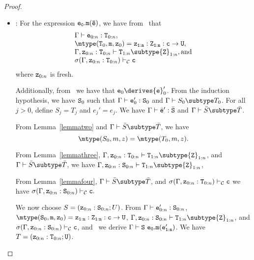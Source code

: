 \begin{proof}
\begin{itemize}
\begin{itemize}
   \item
   \RCInvkRecv: For the expression ${\tt e_0.m(\bar{e})}$,
            we have from \TInvk\ that
            $$
            \begin{array}{l}
            \Gamma \vdash {\tt e}_{0:n} : {\tt T}_{0:n}, \\
            \mtype({\tt T}_0,{\tt m},{\tt z}_0) = 
               \tt {\tt z}_{1:n}: {\tt Z}_{1:n}:c \rightarrow {\tt U}, \\
            \Gamma, {\tt z}_{0:n}: {\tt T}_{0:n} \vdash 
                  {\tt T}_{1:n} \subtype {\tt Z}_{1:n}, \mbox{and} \\
            \sigma(\Gamma, {\tt z}_{0:n}: {\tt T}_{0:n})
                  \vdash_{\cal C} {\tt c} \\
            \end{array}$$
            where ${\tt z}_{0:n}$ is fresh.

            Additionally, from \RCInvkRecv\ we have that
            ${\tt e}_0 \derives {{\tt e}}_0'$.
            From the induction hypothesis, we have ${\tt S}_0$ such that
            $\Gamma \vdash {\tt e}_0': {{\tt S}}_0$ and 
            $\Gamma \vdash S_0 \subtype T_0$.
            For all $j>0$, define $S_j = T_j$ and $e_j' = e_j$.
            We have 
            $\Gamma \vdash \bar{\tt e}': \bar{\tt S}$ and
            $\Gamma \vdash \bar{S} \subtype \bar{T}$.

            From Lemma~\ref{lemmatwo}
            and $\Gamma \vdash \bar{S} \subtype \bar{T}$, we have
            $$\mtype(S_0,m,z) = \mtype(T_0,m,z).$$

            From Lemma~\ref{lemmathree},
            $\Gamma, {\tt z}_{0:n}: {\tt T}_{0:n} \vdash
                  {\tt T}_{1:n} \subtype {\tt Z}_{1:n}$,
            and $\Gamma \vdash \bar{S} \subtype \bar{T}$, we have
            $\Gamma, {\tt z}_{0:n}: {\tt S}_{0:n} \vdash
                  {\tt T}_{1:n} \subtype {\tt Z}_{1:n}$,

            From Lemma~\ref{lemmafour}, 
            $\Gamma \vdash \bar{S} \subtype \bar{T}$, and
            $\sigma(\Gamma, {\tt z}_{0:n}: {\tt T}_{0:n}) \vdash_{\cal C}
                              {\tt c}$
            we have
            $\sigma(\Gamma, {\tt z}_{0:n}: {\tt S}_{0:n}) \vdash_{\cal C}
                              {\tt c}.$

            We now choose 
               $S=({\tt z}_{0:n}: {\tt S}_{0:n}; U)$.
            From 
            $\Gamma \vdash {\tt e}_{0:n}': {\tt S}_{0:n}$,
            $\mtype({\tt S}_0,{\tt m},{\tt z}_0) =
               \tt {\tt z}_{1:n}: {\tt Z}_{1:n}:c \rightarrow {\tt U}$,
            $\Gamma, {\tt z}_{0:n}: {\tt S}_{0:n} \vdash
                  {\tt T}_{1:n} \subtype {\tt Z}_{1:n}$, and
            $\sigma(\Gamma, {\tt z}_{0:n}: {\tt S}_{0:n}) \vdash_{\cal C}
                  {\tt c}$,
            and \TInvk\ we derive
            $\Gamma \vdash {\tt S}\ {\tt e_0.m(e_{1:n}')}$.
            We have 
               $T=({\tt z}_{0:n}: {\tt T}_{0:n}; {\tt U})$.


\end{itemize}
\end{itemize}
\end{proof}
